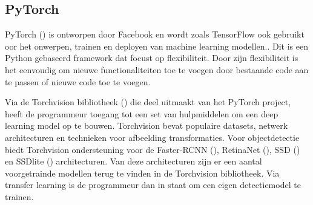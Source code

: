 \subsection{PyTorch}
PyTorch (\cite{li_PyTorch_2020}) is ontworpen door Facebook en wordt zoals TensorFlow ook gebruikt oor het onwerpen, trainen en deployen van machine learning modellen..
Dit is een Python gebaseerd framework dat focust op flexibiliteit.
Door zijn flexibiliteit is het eenvoudig om nieuwe functionaliteiten toe te voegen door bestaande code aan te passen of nieuwe code toe te voegen.

Via de Torchvision bibliotheek (\cite{Facebook_PyTorch_2017}) die deel uitmaakt van het PyTorch project, heeft de programmeur toegang tot een set van hulpmiddelen om een deep learning model op te bouwen.
Torchvision bevat populaire datasets, netwerk architecturen en technieken voor afbeelding transformaties.
Voor objectdetectie biedt Torchvision ondersteuning voor de Faster-RCNN (\cite{ren_faster_2016}), RetinaNet (\cite{lin_focal_2018}), SSD (\cite{liu_ssd_2016}) en SSDlite (\cite{sandler_mobilenetv2_2019}) architecturen.
Van deze architecturen zijn er een aantal voorgetrainde modellen terug te vinden in de Torchvision bibliotheek.
Via transfer learning is de programmeur dan in staat om een eigen detectiemodel te trainen.


